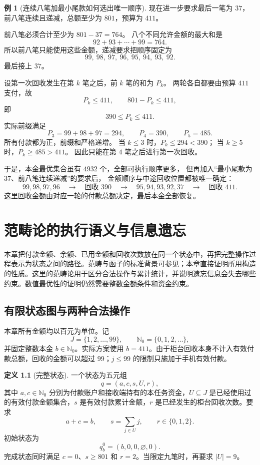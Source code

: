 \documentclass[UTF8,a4paper]{ctexbook}
\theoremstyle{definition}
\newtheorem{definition}[theorem]{定义}
\newtheorem{example}[theorem]{例}
\numberwithin{equation}{chapter}
\newcommand{\1}{\mathbf{1}}
\begin{document}
\begin{example}[连续八笔加最小尾款如何选出唯一顺序]\label{aa:chosen-order}
现在进一步要求最后一笔为 \(37\)，前八笔连续且递减，总额至少为 \(801\)，预算为 \(411\)。

前八笔必须合计至少为 \(801-37=764\)。
八个不同允许金额的最大和是
\[
92+93+\cdots+99=764.
\]
所以前八笔只能使用这些金额，递减要求把顺序固定为
\[
99,\ 98,\ 97,\ 96,\ 95,\ 94,\ 93,\ 92.
\]
最后接上 \(37\)。

设第一次回收发生在第 \(k\) 笔之后，前 \(k\) 笔的和为 \(P_k\)。
两轮各自都要由预算 \(411\) 支付，故
\[
P_k\le411,\qquad801-P_k\le411,
\]
即
\[
390\le P_k\le411.
\]
实际前缀满足
\[
P_3=99+98+97=294,\qquad
P_4=390,\qquad
P_5=485.
\]
所有付款都为正，前缀和严格递增。
当 \(k\le3\) 时，\(P_k\le294<390\)；
当 \(k\ge5\) 时，\(P_k\ge485>411\)。
因此只能在第 \(4\) 笔之后进行第一次回收。

于是，本金最优集合虽有 \(4932\) 个，全部可执行顺序更多，
但再加入“最小尾款为 \(37\)、前八笔连续递减”的要求后，
金额顺序与中途回收位置都被唯一确定：
\[
99,98,97,96
\quad\longrightarrow\quad
\text{回收 }390
\quad\longrightarrow\quad
95,94,93,92,37
\quad\longrightarrow\quad
\text{回收 }411.
\]
这里回收金额由对应一轮的付款总额决定，最后本金全部恢复。
\end{example}

\chapter{范畴论的执行语义与信息遗忘}\label{cat:chapter}

本章把付款金额、余额、已用金额和回收次数放在同一个状态中，再把完整操作过程表示为状态之间的路径。范畴与函子的标准背景可参见\cite{riehl}；本章直接证明所用构造的性质。这里的范畴论用于区分合法操作与累计统计，并说明遗忘信息会失去哪些约束。数值最优性的证明仍然需要整数金额条件和资金约束。

\section{有限状态图与两种合法操作}

本章所有金额均以百元为单位。记
\[
J=\{1,2,\ldots,99\},\qquad
\mathbb N_0=\{0,1,2,\ldots\},
\]
并固定整数本金 $b\in\mathbb N_0$。实际方案使用 $b=411$。由于柜台回收本身不计入有效付款总额，回收的金额可以超过 $99$；$j\le99$ 的限制只施加于手机有效付款。

\begin{definition}[完整状态]\label{cat:state}
一个状态为五元组
\[
q=(a,c,s,U,r),
\]
其中 $a,c\in\mathbb N_0$ 分别为付款账户和接收端持有的本任务资金，$U\subseteq J$ 是已经使用过的有效付款金额集合，$s$ 是有效付款累计金额，$r$ 是已经发生的柜台回收次数。要求
\begin{equation}\label{cat:state-constraints}
a+c=b,\qquad s=\sum_{j\in U}j,\qquad r\in\{0,1,2\}.
\end{equation}
初始状态为
\[
q_b^0=(b,0,0,\varnothing,0).
\]
完成状态同时满足 $c=0$、$s\ge801$ 和 $r=2$。当限定九笔时，再要求 $|U|=9$。
\end{definition}
\end{document}
